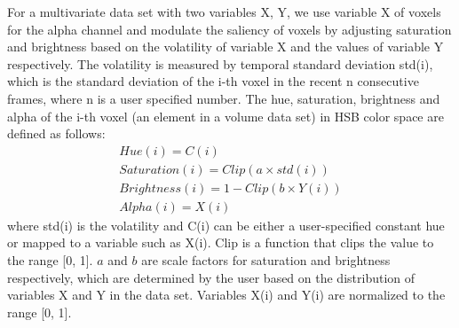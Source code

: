 
For a multivariate data set with two variables X, Y, we use variable X of voxels for the alpha channel and modulate the saliency of voxels by adjusting saturation and brightness based on the volatility of variable X and the values of variable Y respectively.
The volatility is measured by temporal standard deviation std(i), which is the standard deviation of the i-th voxel in the recent n consecutive frames, where n is a user specified number.
The hue, saturation, brightness and alpha of the i-th voxel (an element in a volume data set) in HSB color space are defined as follows:
\begin{align*}
Hue(i) = C(i) \\
Saturation(i) = Clip(a \times std(i)) \\
Brightness(i) = 1-Clip(b \times Y(i)) \\
Alpha(i) = X(i) 
\end{align*}
where std(i) is the volatility and C(i) can be either a user-specified constant hue or mapped to a variable such as X(i). Clip is a function that clips the value to the range [0, 1]. $a$ and $b$ are scale factors for saturation and brightness respectively, which are determined by the user based on the distribution of variables X and Y in the data set. Variables X(i) and Y(i) are normalized to the range [0, 1].



